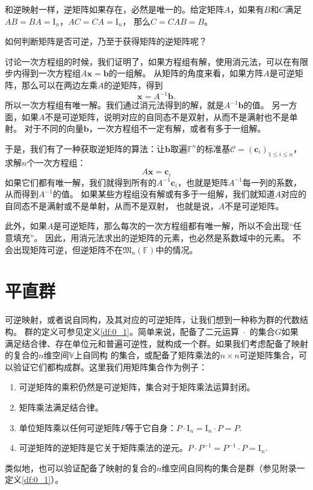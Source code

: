 \documentclass[12pt,UTF8,fontset=none]{ctexbook}
\begin{document}
和逆映射一样，逆矩阵如果存在，必然是唯一的。给定矩阵$A$，如果有$B$和$C$满足$AB=BA=\mathrm{I}_n$，$AC=CA=\mathrm{I}_n$，
那么$C = CAB = B$。

如何判断矩阵是否可逆，乃至于获得矩阵的逆矩阵呢？

讨论一次方程组的时候，我们证明了，如果方程组有解，使用消元法，可以在有限步内得到一次方程组$ A\mathbf{x} = \mathbf{b}$的一组解。
从矩阵的角度来看，如果方阵$A$是可逆矩阵，那么可以在两边左乘$A$的逆矩阵，得到
$$ \mathbf{x} = A^{-1}\mathbf{b}.$$
所以一次方程组有唯一解。我们通过消元法得到的解，就是$A^{-1}\mathbf{b}$的值。
另一方面，如果$A$不是可逆矩阵，说明对应的自同态不是双射，从而不是满射也不是单射。
对于不同的向量$\mathbf{b}$，一次方程组不一定有解，或者有多于一组解。

于是，我们有了一种获取逆矩阵的算法：让$\mathbf{b}$取遍$\mathbb{F}^n$的标准基$\mathcal{C} = (\mathbf{c}_i)_{1\leqslant i \leqslant n}$，求解$n$个一次方程组：
$$ A\mathbf{x} = \mathbf{c}_i$$
如果它们都有唯一解，我们就得到所有的$A^{-1}\mathbf{c}_i$，也就是矩阵$A^{-1}$每一列的系数，从而得到$A^{-1}$的值。
如果某些方程组没有解或有多于一组解，我们就知道$A$对应的自同态不是满射或不是单射，从而不是双射，
也就是说，$A$不是可逆矩阵。

此外，如果$A$是可逆矩阵，那么每次的一次方程组都有唯一解，所以不会出现“任意填充”。
因此，用消元法求出的逆矩阵的元素，也必然是系数域中的元素。
不会出现矩阵可逆，但逆矩阵不在$\mathfrak{M}_n(\mathbb{F})$中的情况。

\section{平直群}
可逆映射，或者说自同构，及其对应的可逆矩阵，让我们想到一种称为群的代数结构。
群的定义可参见定义\ref{df:0_1}。简单来说，配备了二元运算$\,\,\cdot\,\,$的集合$G$如果
满足结合律、存在单位元和普遍可逆性，就构成一个群。如果我们考虑配备了映射的复合的$n$维空间$\mathbb{V}$上自同构
的集合，或配备了矩阵乘法的$n\times n$可逆矩阵集合，可以验证它们都构成群。这里我们用矩阵集合作为例子：
\begin{enumerate}
    \item 可逆矩阵的乘积仍然是可逆矩阵，集合对于矩阵乘法运算封闭。
    \item 矩阵乘法满足结合律。
    \item 单位矩阵乘以任何可逆矩阵$P$等于它自身：$P \cdot \mathrm{I}_n = \mathrm{I}_n \cdot P = P.$
    \item 可逆矩阵的逆矩阵是它关于矩阵乘法的逆元。$P \cdot P^{-1} = P^{-1} \cdot P = \mathrm{I}_n.$
\end{enumerate}
类似地，也可以验证配备了映射的复合的$n$维空间自同构的集合是群（参见附录一定义\ref{df:0_1}）。
\end{document}
